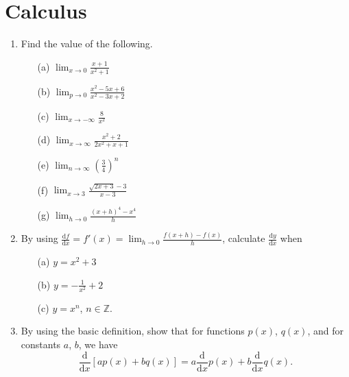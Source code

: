 \documentclass{article}
\begin{document}
\section{Calculus}
\begin{enumerate}
\item Find the value of the following.
        \begin{itemize}
              \item[(a)] $\displaystyle \lim_{x\to 0}\frac{x+1}{x^2+1}$
              \item[(b)] $\displaystyle \lim_{p\to 0}\frac{x^2-5x+6}{x^2-3x+2}$
              \item[(c)] $\displaystyle \lim_{x\to -\infty}\frac{8}{x^2}$
              \item[(d)] $\displaystyle \lim_{x\to \infty} \frac{x^2+2}{2x^2+x+1}$
              \item[(e)] $\displaystyle \lim_{n\to\infty} \left(\frac 34\right)^n$
              \item[(f)] $\displaystyle \lim_{x\to 3}\frac{\sqrt{2x+3}-3}{x-3}$
              \item[(g)] $\displaystyle \lim_{h\to 0}\frac{(x+h)^4-x^4}{h}$
       \end{itemize}
\item By using $\displaystyle \frac{\mathrm df}{\mathrm dx}=f'(x)=\lim_{h\to 0}\frac{f(x+h)-f(x)}{h}$, calculate $\frac{\mathrm dy}{\mathrm dx}$ when
        \begin{itemize}
              \item[(a)] $y=x^2+3$
              \item[(b)] $\displaystyle y=-\frac{1}{x^2}+2$
              \item[(c)] $y=x^n$, $n\in\mathbb{Z}$.
       \end{itemize}
\item By using the basic definition, show that for functions $p(x)$, $q(x)$, and for constants $a$, $b$, we have \[\frac{\mathrm d}{\mathrm dx}[ap(x)+bq(x)]=a\frac{\mathrm d}{\mathrm dx}p(x)+b\frac{\mathrm d}{\mathrm dx}q(x).\]


\end{enumerate}
\end{document}

